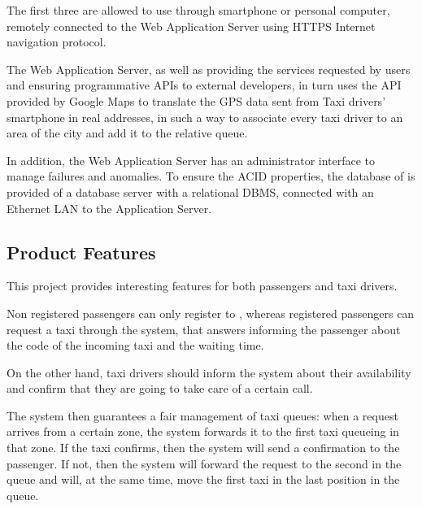 The first three are allowed to use \myTaxiService{} through smartphone or personal computer, remotely connected to the Web Application Server using HTTPS Internet navigation protocol.\par
The Web Application Server, as well as providing the services requested by users and ensuring programmative APIs to external developers, in turn uses the API provided by Google Maps to translate the GPS data sent from Taxi drivers' smartphone in real addresses, in such a way to associate every taxi driver to an area of ​​the city and add it to the relative queue.\par
In addition, the Web Application Server has an administrator interface to manage failures and anomalies. To ensure the ACID properties, the database of \myTaxiService{} is provided of a database server with a relational DBMS, connected with an Ethernet LAN to the Application Server.
\subsection{Product Features}
This project provides interesting features for both passengers and taxi drivers.\par
Non registered passengers can only register to \myTaxiService{}, whereas registered passengers can request a taxi through the system, that answers informing the passenger about the code of the incoming taxi and the waiting time.\par
On the other hand, taxi drivers should inform the system about their availability and confirm that they are going to take care of a certain call.\par
The system then guarantees a fair management of taxi queues: when a request arrives from a certain zone, the system forwards it to the first taxi queueing in that zone.
If the taxi confirms, then the system will send a confirmation to the passenger.
If not, then the system will forward the request to the second in the queue and will, at the same time, move the first taxi in the last position in the queue.
